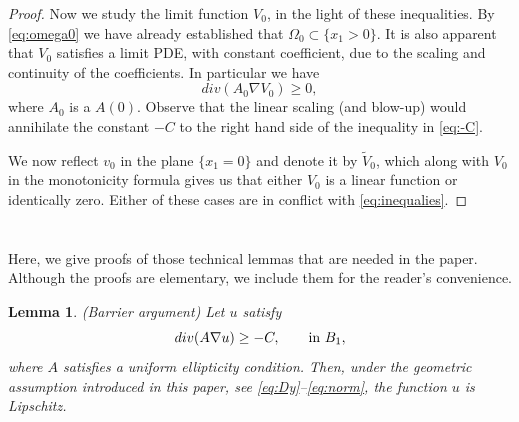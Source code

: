 \documentclass[11pt,reqno]{amsart}
\theoremstyle{plain}
\newtheorem{lem}[thm]{Lemma}
\theoremstyle{remark}
\numberwithin{equation}{section}
\begin{document}
\begin{proof}
Now we study the limit function $V_0$, in the light of these inequalities. By \eqref{eq:omega0} we have already established that $\Omega_0 \subset \{x_1 > 0\} $. It is also apparent that $V_0$ satisfies a limit PDE, with constant coefficient, due to the scaling and continuity of the coefficients. In particular we have 
$$
div(A_0 \nabla V_0)   \geq    0,
$$
where $A_0$ is a $A(0)$.
Observe that the linear scaling (and blow-up)  would annihilate the constant $-C$ to the right hand side of the inequality in \eqref{eq:-C}.

We now reflect $v_0$ in the plane $\{x_1 =0\}$ and  denote it by $\tilde V_0$, which along with $V_0$ in the monotonicity formula gives us that either $V_0$ is a linear function or identically zero. Either of these cases are  in conflict with \eqref{eq:inequalies}.




\end{proof}

\bigskip





















\appendix

\section{}

Here, we give proofs of those technical lemmas that are needed in the paper. Although the proofs are elementary,  we include them  for the reader's convenience. 

\begin{lem}\label{lem:barrier}(Barrier argument)
Let $u$ satisfy 
$$div(A \nabla u) \geq -C, \qquad \hbox{in } B_1,
$$
where $A$ satisfies a uniform ellipticity condition. Then, under the geometric assumption introduced in this paper, see \eqref{eq:Dy}--\eqref{eq:norm}, the function $u$ is Lipschitz.
\end{lem}
\end{document}
